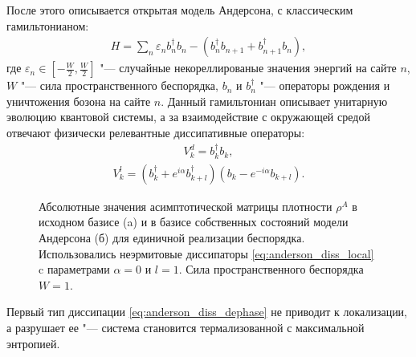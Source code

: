 После этого описывается открытая модель Андерсона, с классическим гамильтонианом:
\begin{equation}
\label{eq:anderson_H}
\begin{gathered}
H = \sum_{n} \varepsilon_n b^\dagger_n b_n - \left(b^\dagger_n b_{n+1} + b^\dagger_{n+1} b_{n}\right),
\end{gathered}
\end{equation}
где \(\varepsilon_n \in \left[-\frac{W}{2}, \frac{W}{2}\right]\) "--- случайные некореллированые значения энергий на сайте \(n\), \(W\) "--- сила пространственного беспорядка, \(b_n\) и \(b^\dagger_n\) "--- операторы рождения и уничтожения бозона на сайте \(n\).
Данный гамильтониан описывает унитарную эволюцию квантовой системы, а за взаимодействие с окружающей средой отвечают физически релевантные диссипативные операторы:
\begin{equation}
\label{eq:anderson_diss_dephase}
\begin{gathered}
V^d_k = b^\dagger_k b_k,
\end{gathered}
\end{equation}
\begin{equation}
\label{eq:anderson_diss_local}
\begin{gathered}
V^l_k = \left( b^\dagger_k + e^{i \alpha} b^\dagger_{k+l}\right) \left( b_k - e^{-i \alpha} b_{k+l} \right).
\end{gathered}
\end{equation}

\begin{figure}[ht]
	\legend{}
	\caption[Асимптотическая матрица плотности с локализацией Андерсона]
	{
		Абсолютные значения асимптотической матрицы плотности \(\rho^A\) в исходном базисе (a) и в базисе собственных состояний модели Андерсона (б) для единичной реализации беспорядка. Использовались неэрмитовые диссипаторы \cref{eq:anderson_diss_local} c параметрами \(\alpha=0\) и \(l=1\). Сила пространственного беспорядка \(W=1\).
	}
	\label{fig:anderson_rho_loc}
\end{figure}

Первый тип диссипации \cref{eq:anderson_diss_dephase} не приводит к локализации, а разрушает ее "--- система становится термализованной с максимальной энтропией.

